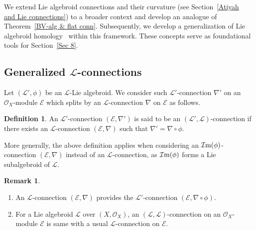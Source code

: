 \documentclass[pdftex]{sigma}
\numberwithin{equation}{section}
\theoremstyle{definition}
\newtheorem{Def}[Thm]{Definition}
\newtheorem{Rem}[Thm]{Remark}
\begin{document}
We extend Lie algebroid connections and their curvature (see Section~\ref{Atiyah and Lie connections}) to a broader context and develop an analogue of Theorem~\ref{BV-alg & flat conn}. Subsequently, we develop a generalization of Lie algebroid homology~\cite{PX} within this framework. These concepts serve as foundational tools for Section~\ref{Sec 8}.

\subsection[Generalized L-connections]{Generalized $\boldsymbol{\mathcal{L}}$-connections}	

Let $(\mathcal{L}', \phi)$ be an $\mathcal{L}$-Lie algebroid. We consider such $\mathcal{L}'$-connection $\nabla'$ on an $\mathcal{O}_X$-module $\mathcal{E}$ which splits by an $\mathcal{L}$-connection $\nabla$ on $\mathcal{E}$ as follows.
\begin{Def}
	An $\mathcal{L}'$-connection $(\mathcal{E}, \nabla')$ is said to be an $(\mathcal{L}', \mathcal{L})$-connection if there exists an $\mathcal{L}$-connection $(\mathcal{E}, \nabla)$ such that $\nabla'=\nabla \circ \phi$.
\end{Def}
More generally, the above definition applies when considering an $\mathcal{I}{\rm m}(\phi)$-connection $(\mathcal{E}, \nabla)$ instead of an $\mathcal{L}$-connection, as $\mathcal{I}{\rm m}(\phi)$ forms a Lie subalgebroid of $\mathcal{L}$.
\begin{Rem}\quad
	\begin{enumerate}\itemsep=0pt
		\item An $\mathcal{L}$-connection $(\mathcal{E}, \nabla)$ provides the $\mathcal{L}'$-connection $(\mathcal{E}, \nabla \circ \phi)$.
		\item For a Lie algebroid $\mathcal{L}$ over $(X, \mathcal{O}_X)$, an $(\mathcal{L}, \mathcal{L})$-connection on an $\mathcal{O}_X$-module $\mathcal{E}$ is same with a usual $ \mathcal{L}$-connection on $\mathcal{E}$.
	\end{enumerate}	
\end{Rem}
\end{document}
